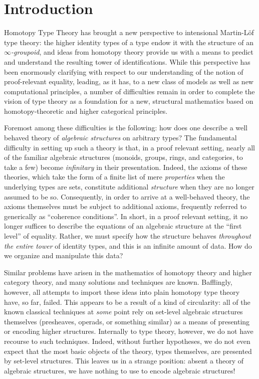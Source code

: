 \section{Introduction}

Homotopy Type Theory has brought a new perspective to intensional
Martin-L\"{o}f type theory: the higher identity types of a type endow
it with the structure of an \emph{$\infty$-groupoid}, and ideas from
homotopy theory provide us with a means to predict and understand the
resulting tower of identifications.  While this perspective has been
enormously clarifying with respect to our understanding of the notion
of proof-relevant equality, leading, as it has, to a new class of
models as well as new computational principles, a number of
difficulties remain in order to complete the vision of type theory as
a foundation for a new, structural mathematics based on
homotopy-theoretic and higher categorical principles.

Foremost among these difficulties is the following: how does one
describe a well behaved theory of \emph{algebraic structures} on
arbitrary types?  The fundamental difficulty in setting up such a
theory is that, in a proof relevant setting, nearly all of the
familiar algebraic structures (monoids, groups, rings, and categories,
to take a few) become \emph{infinitary} in their presentation.
Indeed, the axioms of these theories, which take the form of a finite
list of mere \emph{properties} when the underlying types are sets,
constitute additional \emph{structure} when they are no longer assumed
to be so.  Consequently, in order to arrive at a well-behaved theory, the
axioms themselves must be subject to additional axioms, frequently
referred to generically as ``coherence conditions''. In short, in a
proof relevant setting, it no longer suffices to describe the
equations of an algebraic structure at the ``first level'' of
equality.  Rather, we must specify how the structure behaves
\emph{throughout the entire tower} of identity types, and this is an
infinite amount of data.  How do we organize and manipulate this data?

Similar problems have arisen in the mathematics of homotopy theory and
higher category theory, and many solutions and techniques are known.
Bafflingly, however, all attempts to import these ideas into plain
homotopy type theory have, so far, failed.  This appears to be a
result of a kind of circularity: all of the known classical techniques
at \emph{some} point rely on set-level algebraic structures themselves
(presheaves, operads, or something similar) as a means of presenting
or encoding higher structures.  Internally to type theory, however, we
do not have recourse to such techniques.  Indeed, without further
hypotheses, we do not even expect that the most basic objects of the
theory, types themselves, are presented by set-level structures. This
leaves us in a strange position: absent a theory of algebraic
structures, we have nothing to use to encode algebraic structures!

